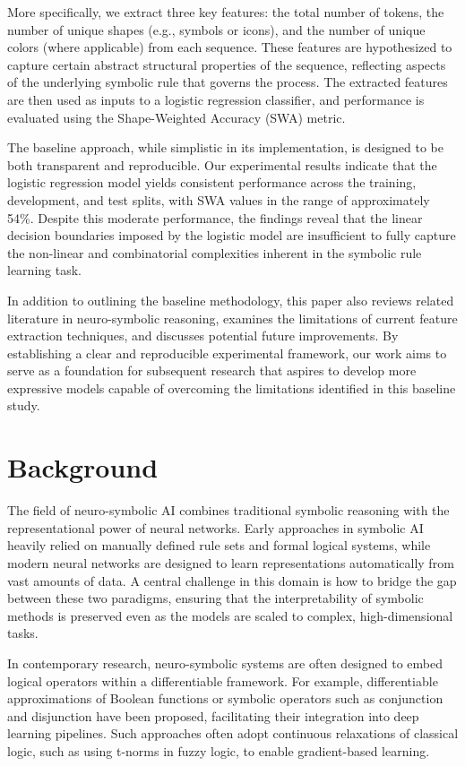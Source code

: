 \documentclass{article}
\begin{document}
More specifically, we extract three key features: the total number of tokens, the number of unique shapes (e.g., symbols or icons), and the number of unique colors (where applicable) from each sequence. These features are hypothesized to capture certain abstract structural properties of the sequence, reflecting aspects of the underlying symbolic rule that governs the process. The extracted features are then used as inputs to a logistic regression classifier, and performance is evaluated using the Shape-Weighted Accuracy (SWA) metric. 

The baseline approach, while simplistic in its implementation, is designed to be both transparent and reproducible. Our experimental results indicate that the logistic regression model yields consistent performance across the training, development, and test splits, with SWA values in the range of approximately 54\%. Despite this moderate performance, the findings reveal that the linear decision boundaries imposed by the logistic model are insufficient to fully capture the non-linear and combinatorial complexities inherent in the symbolic rule learning task.

In addition to outlining the baseline methodology, this paper also reviews related literature in neuro-symbolic reasoning, examines the limitations of current feature extraction techniques, and discusses potential future improvements. By establishing a clear and reproducible experimental framework, our work aims to serve as a foundation for subsequent research that aspires to develop more expressive models capable of overcoming the limitations identified in this baseline study.

\section{Background}
The field of neuro-symbolic AI combines traditional symbolic reasoning with the representational power of neural networks. Early approaches in symbolic AI heavily relied on manually defined rule sets and formal logical systems, while modern neural networks are designed to learn representations automatically from vast amounts of data. A central challenge in this domain is how to bridge the gap between these two paradigms, ensuring that the interpretability of symbolic methods is preserved even as the models are scaled to complex, high-dimensional tasks.

In contemporary research, neuro-symbolic systems are often designed to embed logical operators within a differentiable framework. For example, differentiable approximations of Boolean functions or symbolic operators such as conjunction and disjunction have been proposed, facilitating their integration into deep learning pipelines. Such approaches often adopt continuous relaxations of classical logic, such as using t-norms in fuzzy logic, to enable gradient-based learning.
\end{document}
